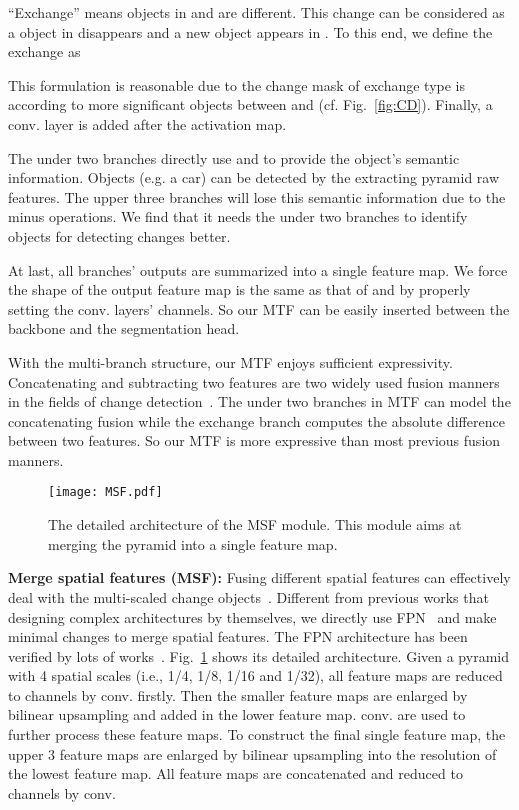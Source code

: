 \documentclass[review]{elsarticle}
\begin{document}
``Exchange'' means objects in  and  are different. This change can be considered as a object in  disappears and a new object appears in . To this end, we define the exchange as

This formulation is reasonable due to the change mask of exchange type is according to more significant objects between  and  (cf. Fig.~\ref{fig:CD}). Finally, a  conv. layer is added after the activation map. 

The under two branches directly use  and  to provide the object's semantic information. Objects (e.g. a car) can be detected by the extracting pyramid raw features. The upper three branches will lose this semantic information due to the minus operations. We find that it needs the under two branches to identify objects for detecting changes better.

At last, all branches' outputs are summarized into a single feature map. We force the shape of the output feature map is the same as that of  and  by properly setting the conv. layers' channels. So our MTF can be easily inserted between the backbone and the segmentation head.

With the multi-branch structure, our MTF enjoys sufficient expressivity. Concatenating and subtracting two features are two widely used fusion manners in the fields of change detection~\cite{FC_EF,ChangeNet,HPCFNet,CosimNet}. The under two branches in MTF can model the concatenating fusion while the exchange branch computes the absolute difference between two features. So our MTF is more expressive than most previous fusion manners.

\begin{figure}
	\centering
	\texttt{[image: MSF.pdf]}
	\caption{The detailed architecture of the MSF module. This module aims at merging the pyramid into a single feature map.}
	\label{fig:MSF}
\end{figure}

\textbf{Merge spatial features (MSF):} Fusing different spatial features can effectively deal with the multi-scaled change objects~\cite{HPCFNet}. Different from previous works that designing complex architectures by themselves, we directly use FPN~\cite{FPN} and make minimal changes to merge spatial features. The FPN architecture has been verified by lots of works~\cite{PFPN,mask_rcnn}. Fig.~\ref{fig:MSF} shows its detailed architecture. Given a pyramid with 4 spatial scales (i.e., 1/4, 1/8, 1/16 and 1/32), all feature maps are reduced to  channels by  conv. firstly. Then the smaller feature maps are enlarged by  bilinear upsampling and added in the lower feature map.  conv. are used to further process these feature maps. To construct the final single feature map, the upper 3 feature maps are enlarged by bilinear upsampling into the resolution of the lowest feature map. All feature maps are concatenated and reduced to  channels by  conv.
\end{document}
